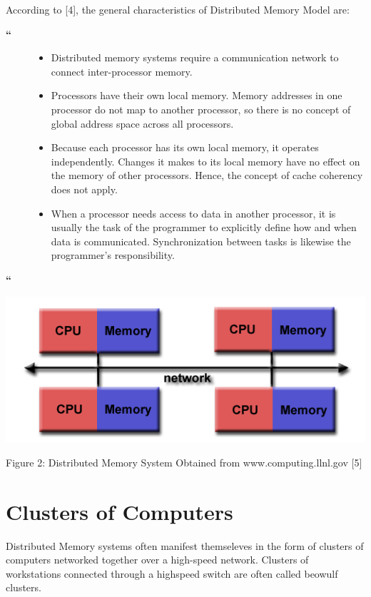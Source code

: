 \documentclass[letterpaper,10pt,openany,oneside]{sphinxmanual}
\begin{document}
According to {[}4{]}, the general characteristics of Distributed Memory Model are:
\begin{description}
\item[{\textbf{``}}] \leavevmode\begin{itemize}
\item {} 
Distributed memory systems require a communication network to connect inter-processor memory.

\item {} 
Processors have their own local memory. Memory addresses in one processor do not map to another processor, so there is no concept of global address space across all processors.

\item {} 
Because each processor has its own local memory, it operates independently. Changes it makes to its local memory have no effect on the memory of other processors. Hence, the concept of cache coherency does not apply.

\item {} 
When a processor needs access to data in another processor, it is usually the task of the programmer to explicitly define how and when data is communicated. Synchronization between tasks is likewise the programmer's responsibility.

\end{itemize}

\end{description}

\textbf{``}

{\hfill\includegraphics{DistributedMemory.png}\hfill}

\begin{center}Figure 2: Distributed Memory System Obtained from www.computing.llnl.gov {[}5{]}
\end{center}

\section{Clusters of Computers}
\label{IntroCluster/IntroCluster:clusters-of-computers}
Distributed Memory systems often manifest themseleves in the form of clusters of computers networked together over a high-speed network. Clusters of workstations connected through a highspeed switch are often called beowulf clusters.
\end{document}
